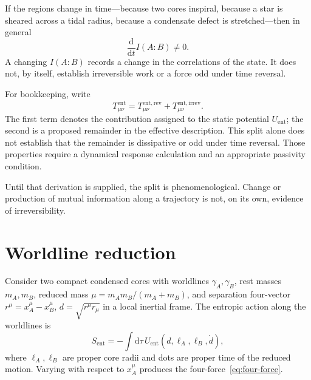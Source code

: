 If the regions change in time---because two cores inspiral,
because a star is sheared across a tidal radius, because a
condensate defect is stretched---then in general
\begin{equation}
  \label{eq:I-dot}
  \frac{\mathrm{d}}{\mathrm{d}t}I(A:B)
  \neq 0.
\end{equation}
A changing \(I(A:B)\) records a change in the correlations of the
state. It does not, by itself, establish irreversible work or a
force odd under time reversal.

\begin{definition}
  \label{def:Tirrev}
  For bookkeeping, write
  \begin{equation}
    \label{eq:split-rev-irrev}
    T_{\mu\nu}^{\mathrm{ent}}
    =T_{\mu\nu}^{\mathrm{ent,rev}}
     +T_{\mu\nu}^{\mathrm{ent,irrev}}.
  \end{equation}
  The first term denotes the contribution assigned to the static
  potential \(U_{\mathrm{ent}}\); the second is a proposed
  remainder in the effective description. This split alone does
  not establish that the remainder is dissipative or odd under
  time reversal. Those properties require a dynamical response
  calculation and an appropriate passivity condition.
\end{definition}

Until that derivation is supplied, the split is phenomenological.
Change or production of mutual information along a trajectory is
not, on its own, evidence of irreversibility.

\section{Worldline reduction}
\label{sec:ch14-worldline}

Consider two compact condensed cores with worldlines
\(\gamma_A,\gamma_B\), rest masses \(m_A,m_B\), reduced mass
\(\mu=m_A m_B/(m_A+m_B)\), and separation four-vector
\(r^\mu=x_A^\mu-x_B^\mu\), \(d=\sqrt{r^\mu r_\mu}\) in a local
inertial frame. The entropic action along the worldlines is
\begin{equation}
  \label{eq:Sent-wl}
  S_{\mathrm{ent}}
  =-\int\mathrm{d}\tau\,U_{\mathrm{ent}}(d,\ell_A,\ell_B,\dot d),
\end{equation}
where \(\ell_A,\ell_B\) are proper core radii and dots are proper
time of the reduced motion. Varying with respect to \(x_A^\mu\)
produces the four-force~\eqref{eq:four-force}.

